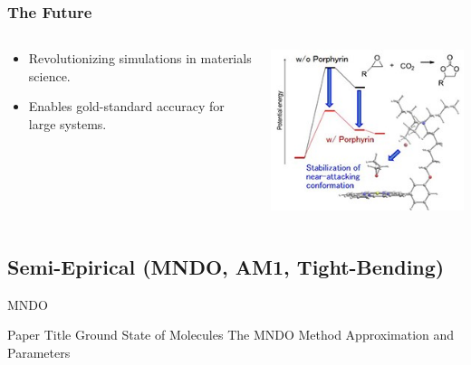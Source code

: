 \begin{frame}
    \frametitle{The Future}
    \begin{columns}[T]
        \begin{column}{0.5\textwidth}
            \vspace{2cm}
            \begin{itemize}
                \item Revolutionizing simulations in materials science.
                \item Enables gold-standard accuracy for large systems.
            \end{itemize}
        \end{column}
        \begin{column}{0.5\textwidth}
            \includegraphics[width=\textwidth]{images/CCSD(T)3.jpg}
        \end{column}
    \end{columns}
\end{frame}


\subsection{Semi-Epirical (MNDO, AM1, Tight-Bending)}


\begin{frame}{MNDO}
	\begin{block}{Paper Title}
	Ground State of Molecules The MNDO Method Approximation and Parameters
	\end{block}
\end{frame}

